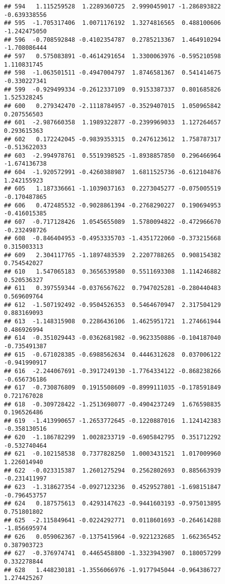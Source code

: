 \documentclass[
]{article}
\begin{document}
\begin{verbatim}
## 594   1.115259528  1.2289360725  2.9990459017 -1.286893822 -0.639338556
## 595  -1.705317406  1.0071176192  1.3274816565  0.488100606 -1.242475050
## 596  -0.708592848 -0.4102354787  0.2785213367  1.464910294 -1.708086444
## 597   0.575083891 -0.4614291654  1.3300063976 -0.595210598  1.110831745
## 598  -1.063501511 -0.4947004797  1.8746581367  0.541414675 -0.330227341
## 599  -0.929499334 -0.2612337109  0.9153387337  0.801685826  1.525328245
## 600   0.279342470 -2.1118784957 -0.3529407015  1.050965842  0.207556503
## 601  -2.987660358  1.1989322877 -0.2399969033  1.127264657  0.293615363
## 602   0.172242045 -0.9839353315  0.2476123612  1.758787317 -0.513622033
## 603  -2.994978761  0.5519398525 -1.8938857850  0.296466964 -1.674136738
## 604  -1.920572991 -0.4260388987  1.6811525736 -0.612104876  1.242155923
## 605   1.187336661 -1.1039037163  0.2273045277 -0.075005519 -0.170487865
## 606   0.472485532 -0.9028861394 -0.2768290227  0.190694953 -0.416015385
## 607  -0.717128426  1.0545655089  1.5780094822 -0.472966670 -0.232498726
## 608  -0.846404953 -0.4953335703 -1.4351722060 -0.373215668  0.315003313
## 609   2.304117765 -1.1897483539  2.2207788265  0.908154382  0.754542027
## 610   1.547065183  0.3656539580  0.5511693308  1.114246882  0.520536327
## 611   0.397559344 -0.0376567622  0.7947025281 -0.280440483  0.569609764
## 612  -1.507192492 -0.9504526353  0.5464670947  2.317504129  0.883169093
## 613  -1.148315908  0.2286436106  1.4625951721  1.274661944  0.486926994
## 614  -0.351029443 -0.0362681982 -0.9623350886 -0.104187040 -0.735491387
## 615  -0.671028385 -0.6988562634  0.4446312628  0.037006122 -0.941990917
## 616  -2.244067691 -0.3917249130 -1.7764334122 -0.868238266 -0.656736186
## 617  -0.730876809  0.1915508609 -0.8999111035 -0.178591849  0.721767028
## 618  -0.309728422 -1.2513698077 -0.4904237249  1.676598835  0.196526486
## 619  -1.413990657 -1.2653772645 -0.1220887016  1.124142383 -0.358130516
## 620  -1.186782299  1.0028233719 -0.6905842795  0.351712292 -0.532740464
## 621  -0.102158538  0.7377828250  1.0003431521  1.017009960  1.226014940
## 622  -0.023315387  1.2601275294  0.2562802693  0.885663939 -0.231411997
## 623  -1.318627354 -0.0927123236  0.4529527801 -1.698151847 -0.796453757
## 624   0.187575613  0.4293147623 -0.9441603193 -0.975013895  0.751801802
## 625  -2.115849641 -0.0224292771  0.0118601693 -0.264614288 -1.856695974
## 626   0.059062367 -0.1375415964 -0.9221232685  1.662365452  0.387903723
## 627  -0.376974741  0.4465458800 -1.3323943907  0.180057299  0.332278844
## 628   1.448230181 -1.3556066976 -1.9177945044 -0.964386727  1.274425267

\end{verbatim}
\end{document}
